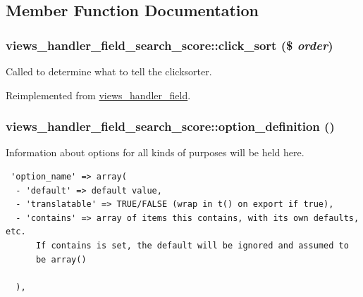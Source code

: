 \subsection{Member Function Documentation}
\hypertarget{classviews__handler__field__search__score_b3ddf2a010848822c751a774f5bf9a67}{
\subsubsection[{click\_\-sort}]{\setlength{\rightskip}{0pt plus 5cm}views\_\-handler\_\-field\_\-search\_\-score::click\_\-sort (\$ {\em order})}}
\label{classviews__handler__field__search__score_b3ddf2a010848822c751a774f5bf9a67}


Called to determine what to tell the clicksorter. 

Reimplemented from \hyperlink{classviews__handler__field_1c8cabe835ba05ed045c8f6eec6a36b8}{views\_\-handler\_\-field}.\hypertarget{classviews__handler__field__search__score_ac88046a858aad74c178cd019b2f236b}{
\subsubsection[{option\_\-definition}]{\setlength{\rightskip}{0pt plus 5cm}views\_\-handler\_\-field\_\-search\_\-score::option\_\-definition ()}}
\label{classviews__handler__field__search__score_ac88046a858aad74c178cd019b2f236b}


Information about options for all kinds of purposes will be held here. 

\begin{Code}\begin{verbatim} 'option_name' => array(
  - 'default' => default value,
  - 'translatable' => TRUE/FALSE (wrap in t() on export if true),
  - 'contains' => array of items this contains, with its own defaults, etc.
      If contains is set, the default will be ignored and assumed to
      be array()

  ),
\end{verbatim}
\end{Code}

